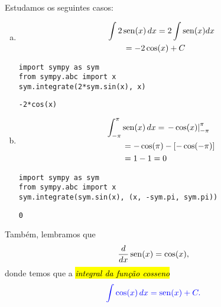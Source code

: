 \begin{ex}
  Estudamos os seguintes casos:
  \begin{enumerate}[a)]
  \item
    \begin{align}
      & \int 2\operatorname{sen}(x)\,dx = 2\int \operatorname{sen}(x) dx\\
      &\text{}\qquad = -2\cos(x) + C
    \end{align}

\begin{lstlisting}
import sympy as sym
from sympy.abc import x
sym.integrate(2*sym.sin(x), x)
\end{lstlisting}

\begin{verbatim}
-2*cos(x)
\end{verbatim}

  \item
    \begin{align}
      & \int_{-\pi}^\pi\operatorname{sen}(x)\,dx = \left.-\cos(x)\right|_{-\pi}^\pi\\
      &\text{}\qquad = -\cos(\pi) - [-\cos(-\pi)]\\
      &\text{}\qquad = 1 - 1 = 0
    \end{align}

\begin{lstlisting}
import sympy as sym
from sympy.abc import x
sym.integrate(sym.sin(x), (x, -sym.pi, sym.pi))
\end{lstlisting}

\begin{verbatim}
0
\end{verbatim}

  \end{enumerate}
\end{ex}

Também, lembramos que
\begin{equation}
  \frac{d}{dx}\operatorname{sen}(x) = \cos(x),
\end{equation}
donde temos que a \hl{\emph{integral da função cosseno}}
\begin{equation}\color{blue}\int \cos(x)\,dx = \operatorname{sen}(x) + C.
\end{equation}

